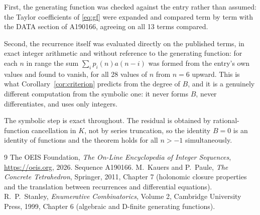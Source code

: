 \documentclass[11pt,a4paper]{article}
\theoremstyle{plain}
\theoremstyle{definition}
\begin{document}
First, the generating function was checked against the entry rather than assumed: the
Taylor coefficients of \eqref{eq:gf} were expanded and compared term by term with the DATA
section of A190166, agreeing on all 13 terms compared.

Second, the recurrence itself was evaluated directly on the published terms, in exact
integer arithmetic and without reference to the generating function: for each $n$ in range
the sum $\sum_{i}p_{i}(n)a(n-i)$ was formed from the entry's own values and found to
vanish, for all 28 values of $n$ from $n=6$ upward. This is what
Corollary~\ref{cor:criterion} predicts from the degree of $B$, and it is a genuinely
different computation from the symbolic one: it never forms $B$, never differentiates, and
uses only integers.

The symbolic step is exact throughout. The residual is obtained by rational-function
cancellation in $K$, not by series truncation, so the identity $B=0$ is an
identity of functions and the theorem holds for all $n>-1$ simultaneously.

\begin{thebibliography}{9}
 The OEIS Foundation, \emph{The On-Line Encyclopedia of Integer Sequences},
\url{https://oeis.org}, 2026. Sequence A190166.
 M.~Kauers and P.~Paule, \emph{The Concrete Tetrahedron}, Springer, 2011,
Chapter 7 (holonomic closure properties and the translation between recurrences and
differential equations).
 R.~P.~Stanley, \emph{Enumerative Combinatorics}, Volume 2, Cambridge
University Press, 1999, Chapter 6 (algebraic and D-finite generating functions).
\end{thebibliography}
\end{document}
